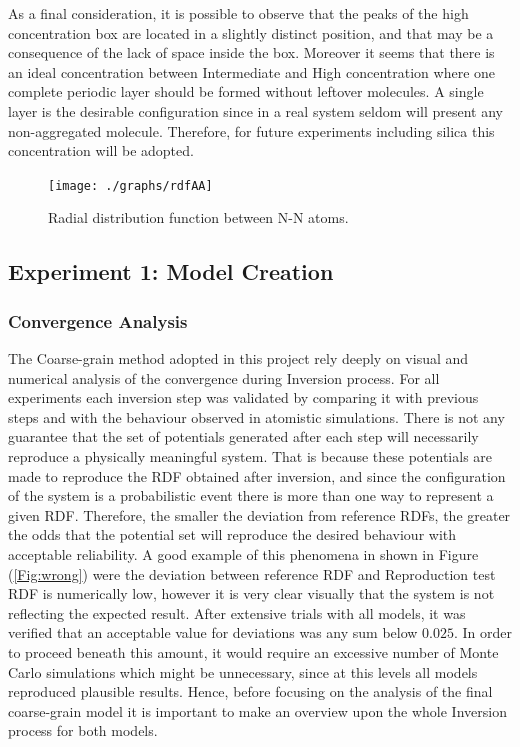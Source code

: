 \documentclass[10pt,a4paper,twoside]{article}
\begin{document}
As a final consideration, it is possible to observe that the peaks of the high concentration box are located in a slightly distinct position, and that may be a consequence of the lack of space inside the box. Moreover it seems that there is an ideal concentration between Intermediate and High concentration where one complete periodic layer should be formed without leftover molecules. A single layer is the desirable configuration since in a real system seldom will present any non-aggregated molecule. Therefore, for future experiments including silica this concentration will be adopted.
\begin{figure}[H]
  \begin{center}
	\texttt{[image: ./graphs/rdfAA]}
	\caption{Radial distribution function between N-N atoms. }
	\label{Fig:rdfAA}
  \end{center}
\end{figure}
\subsection{Experiment 1: Model Creation}
\subsubsection{Convergence Analysis}
The Coarse-grain method adopted in this project rely deeply on visual and numerical analysis of the convergence during Inversion process. For all experiments each inversion step was validated by comparing it with previous steps and with the behaviour observed in atomistic simulations. There is not any guarantee that the set of potentials generated after each step will necessarily reproduce a physically meaningful system.  That is because these potentials are made to reproduce the RDF obtained after inversion, and since the configuration of the system is a probabilistic event there is more than one way to represent a given RDF. Therefore, the smaller the deviation from reference RDFs, the greater the odds that the potential set will reproduce the desired behaviour with acceptable reliability. A good example of this phenomena in shown in Figure (\ref{Fig:wrong}) were the deviation between reference RDF and Reproduction test RDF is numerically low, however it is very clear visually that the system is not reflecting the expected result. After extensive trials  with all models, it was verified that an acceptable value for deviations was any sum below $0.025$. In order to proceed beneath this amount, it would require an excessive number of Monte Carlo simulations which might be unnecessary, since at this levels all models reproduced plausible results. Hence, before focusing on the analysis of the final coarse-grain model it is important to make an overview upon the whole Inversion process for both models.
\end{document}
